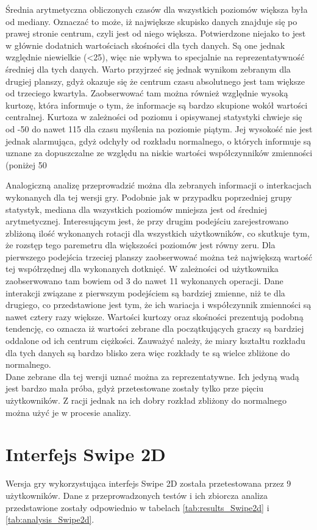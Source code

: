 \documentclass[a4paper,12pt,numbers=noenddot]{report}
\begin{document}
Średnia arytmetyczna obliczonych czasów dla wszystkich poziomów większa była od mediany. Oznaczać to może, iż największe skupisko danych znajduje się po prawej stronie centrum, czyli jest od niego większa. Potwierdzone niejako to jest w głównie dodatnich wartościach skośności dla tych danych. Są one jednak względnie niewielkie (<25), więc nie wpływa to specjalnie na reprezentatywność średniej dla tych danych. 
Warto przyjrzeć się jednak wynikom zebranym dla drugiej planszy, gdyż okazuje się że centrum czasu absolutnego jest tam większe od trzeciego kwartyla. Zaobserwować tam można również względnie wysoką kurtozę, która informuje o tym, że informacje są bardzo skupione wokół wartości centralnej.
Kurtoza w zależności od poziomu i opisywanej statystyki chwieje się od -50 do nawet 115 dla czasu myślenia na poziomie piątym. Jej wysokość nie jest jednak alarmująca, gdyż odchyły od rozkładu normalnego, o których informuje są uznane za dopuszczalne ze względu na niskie wartości współczynników zmienności (poniżej 50%

Analogiczną analizę przeprowadzić można dla zebranych informacji o interkacjach wykonanych dla tej wersji gry. Podobnie jak w przypadku poprzedniej grupy statystyk, mediana dla wszystkich poziomów mniejsza jest od średniej arytmetycznej. Interesującym jest, że przy drugim podejściu zarejestrowano zbliżoną ilość wykonanych rotacji dla wszystkich użytkowników, co skutkuje tym, że rozstęp tego paremetru dla większości poziomów jest równy zeru. Dla pierwszego podejścia trzeciej planszy zaobserwować można też największą wartość tej współrzędnej dla wykonanych dotknięć. W zależności od użytkownika zaobserwowano tam bowiem od 3 do nawet 11 wykonanych operacji.
Dane interakcji związane z pierwszym podejściem są bardziej zmienne, niż te dla drugiego, co przedstawione jest tym, że ich wariacja i współczynnik zmienności są nawet cztery razy większe. Wartości kurtozy oraz skośności prezentują podobną tendencję, co oznacza iż wartości zebrane dla początkujących graczy są bardziej oddalone od ich centrum ciężkości. Zauważyć należy, że miary kształtu rozkładu dla tych danych są bardzo blisko zera więc rozkłady te są wielce zbliżone do normalnego.\\

Dane zebrane dla tej wersji uznać można za reprezentatywne. Ich jedyną wadą jest bardzo mała próba, gdyż przetestowane zostały tylko prze pięciu użytkowników. Z racji jednak na ich dobry rozkład zbliżony do normalnego można użyć je w procesie analizy.


\section{Interfejs Swipe 2D}%
Wersja gry wykorzystująca interfejs Swipe 2D została przetestowana przez 9 użytkowników. Dane z przeprowadzonych testów i ich zbiorcza analiza przedstawione zostały odpowiednio w tabelach \ref{tab:results_Swipe2d} i \ref{tab:analysis_Swipe2d}.
\end{document}
